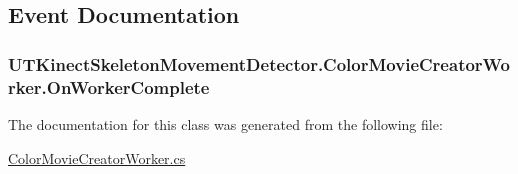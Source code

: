 \subsection{Event Documentation}
\hypertarget{classUTKinectSkeletonMovementDetector_1_1ColorMovieCreatorWorker_aa3e3f57176cf63366e90893f7095aa83}{
\subsubsection[{On\-Worker\-Complete}]{ U\-T\-Kinect\-Skeleton\-Movement\-Detector.\-Color\-Movie\-Creator\-Worker.\-On\-Worker\-Complete}}\label{classUTKinectSkeletonMovementDetector_1_1ColorMovieCreatorWorker_aa3e3f57176cf63366e90893f7095aa83}


The documentation for this class was generated from the following file\-:\begin{DoxyCompactItemize}
\item 
\hyperlink{ColorMovieCreatorWorker_8cs}{Color\-Movie\-Creator\-Worker.\-cs}\end{DoxyCompactItemize}
